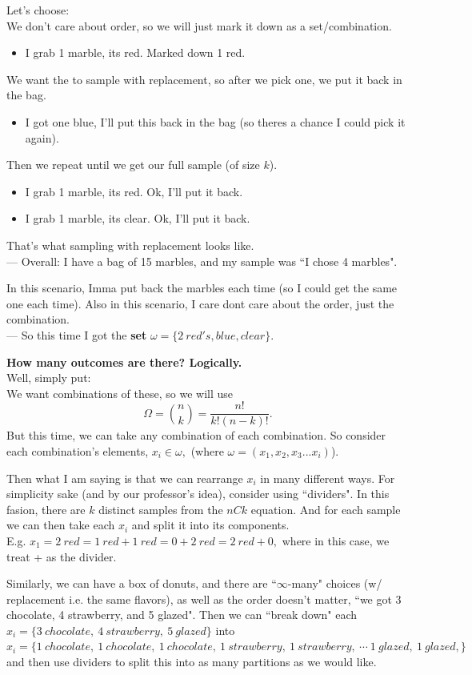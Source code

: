 \documentclass[12pt]{book}
\begin{document}
\noindent Let's choose: \\
We don't care about order, so we will just mark it down as a set/combination.
\begin{itemize}
\item I grab 1 marble, its red. Marked down 1 red.
\end{itemize}
We want the to sample with replacement, so after we pick one, we put it back in the bag. 
\begin{itemize}
\item I got one blue, I'll put this back in the bag (so theres a chance I could pick it again).
\end{itemize}
Then we repeat until we get our full sample (of size $k$). 
\begin{itemize}
\item I grab 1 marble, its red. Ok, I'll put it back. 
\item I grab 1 marble, its clear. Ok, I'll put it back.
\end{itemize}
That's what sampling with replacement looks like. \\
--- Overall: I have a bag of 15 marbles, and my sample was ``I chose 4 marbles". 

In this scenario, Imma put back the marbles each time (so I could get the same one each time). Also in this scenario, I care dont care about the order, just the combination.\\
--- So this time I got the \textbf{set} $\omega =\big\{2~red's, blue, clear\big\}$.

\noindent \textbf{How many outcomes are there? Logically.} \\
Well, simply put:\\
We want combinations of these, so we will use 
$$\Omega = {n \choose k} = \frac{n!}{k!(n-k)!}.$$
But this time, we can take any combination of each combination. So consider each combination's elements, $x_i \in \omega,$ (where $\omega= (x_1,x_2,x_3...x_i)$). 

Then what I am saying is that we can rearrange $x_i$ in many different ways. For simplicity sake (and by our professor's idea), consider using ``dividers". In this fasion, there are $k$ distinct samples from the $nCk$ equation. And for each sample we can then take each $x_i$ and split it into its components. \\
E.g. $x_1 = 2~red = 1~red+1~red = 0+2~red = 2~red+0,$ where in this case, we treat + as the divider.

Similarly, we can have a box of donuts, and there are ``$\infty$-many" choices (w/ replacement i.e. the same flavors), as well as the order doesn't matter, ``we got 3 chocolate, 4 strawberry, and 5 glazed". Then we can ``break down" each \\
$x_i = \{ 3~chocolate,~4~strawberry,~5~glazed \}$ into  \\
$x_i = \{ 1~chocolate,~ 1~chocolate,~ 1~chocolate,~1~strawberry,~ 1~strawberry,~\cdots ~1~glazed,~1~glazed,\}$\\
and then use dividers to split this into as many partitions as we would like.
\end{document}
